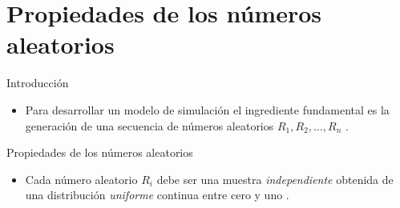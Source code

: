 \section[Propiedades]{Propiedades de los números aleatorios}
\begin{frame}{Introducción}
    \begin{itemize}
        \item Para desarrollar un modelo de simulación el ingrediente fundamental es la generación de una secuencia de números aleatorios $R_1, R_2, \dots , R_n$ \cite{BCN}.
    \end{itemize}
\end{frame}

\begin{frame}{Propiedades de los números aleatorios}
    \begin{itemize}
        
        \item Cada número aleatorio $R_i$ debe ser una muestra \textit{independiente} obtenida de una distribución \textit{uniforme} continua entre cero y uno \cite{BCN}.
        
    \end{itemize}
\end{frame}

